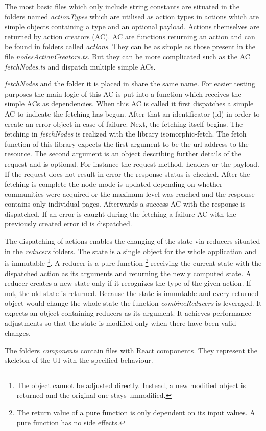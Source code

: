 The most basic files which only include string constants are situated in the folders named \textit{actionTypes} which are utilised as action types in actions which are simple objects containing a type and an optional payload. Actions themselves are returned by action creators (AC). AC are functions returning an action and can be found in folders called \textit{actions}. They can be as simple as those present in the file \textit{nodesActionCreators.ts}. But they can be more complicated such as the AC \textit{fetchNodes.ts} and dispatch multiple simple ACs. 

\textit{fetchNodes} and the folder it is placed in share the same name. For easier testing purposes the main logic of this AC is put into a function which receives the simple ACs as dependencies. When this AC is called it first dispatches a simple AC to indicate the fetching has begun. After that an identificator (id) in order to create an error object in case of failure. Next, the fetching itself begins. The fetching in \textit{fetchNodes} is realized with the library isomorphic-fetch. The fetch function of this library expects the first argument to be the url address to the resource. The second argument is an object describing further details of the request and is optional. For instance the request method, headers or the payload. If the request does not result in error the response status is checked. After the fetching is complete the node-mode is updated depending on whether communities were acquired or the maximum level was reached and the response contains only individual pages. Afterwards a success AC with the response is dispatched. If an error is caught during the fetching a failure AC with the previously created error id is dispatched.

The dispatching of actions enables the changing of the state via reducers situated in the \textit{reducers} folders. The state is a single object for the whole application and is immutable \footnote{The object cannot be adjusted directly. Instead, a new modified object is returned and the original one stays unmodified.}. A reducer is a pure function \footnote{The return value of a pure function is only dependent on its input values. A pure function has no side effects.} receiving the current state with the dispatched action as its arguments and returning the newly computed state. A reducer creates a new state only if it recognizes the type of the given action. If not, the old state is returned. Because the state is immutable and every returned object would change the whole state the function \textit{combineReducers} is leveraged. It expects an object containing reducers as its argument. It achieves performance adjustments so that the state is modified only when there have been valid changes.

The folders \textit{components} contain files with React components. They represent the skeleton of the UI with the specified behaviour. 

